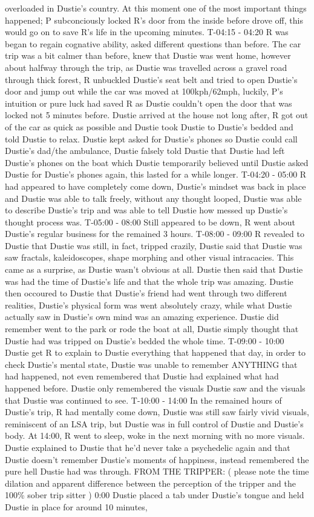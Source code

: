 \documentclass[12pt]{book}
\begin{document}
overloaded in Dustie's country. At this moment one of the most important things happened; P subconciously locked R's door from the inside before drove off, this would go on to save R's life in the upcoming minutes. T-04:15 - 04:20 R was began to regain cognative ability, asked different questions than before. The car trip was a bit calmer than before, knew that Dustie was went home, however about halfway through the trip, as Dustie was travelled across a gravel road through thick forest, R unbuckled Dustie's seat belt and tried to open Dustie's door and jump out while the car was moved at 100kph/62mph, luckily, P's intuition or pure luck had saved R as Dustie couldn't open the door that was locked not 5 minutes before. Dustie arrived at the house not long after, R got out of the car as quick as possible and Dustie took Dustie to Dustie's bedded and told Dustie to relax. Dustie kept asked for Dustie's phones so Dustie could call Dustie's dad/the ambulance, Dustie falsely told Dustie that Dustie had left Dustie's phones on the boat which Dustie temporarily believed until Dustie asked Dustie for Dustie's phones again, this lasted for a while longer. T-04:20 - 05:00 R had appeared to have completely come down, Dustie's mindset was back in place and Dustie was able to talk freely, without any thought looped, Dustie was able to describe Dustie's trip and was able to tell Dustie how messed up Dustie's thought process was. T-05:00 - 08:00 Still appeared to be down, R went about Dustie's regular business for the remained 3 hours. T-08:00 - 09:00 R revealed to Dustie that Dustie was still, in fact, tripped crazily, Dustie said that Dustie was saw fractals, kaleidoscopes, shape morphing and other visual intracacies. This came as a surprise, as Dustie wasn't obvious at all. Dustie then said that Dustie was had the time of Dustie's life and that the whole trip was amazing. Dustie then occoured to Dustie that Dustie's friend had went through two different realities, Dustie's physical form was went absolutely crazy, while what Dustie actually saw in Dustie's own mind was an amazing experience. Dustie did remember went to the park or rode the boat at all, Dustie simply thought that Dustie had was tripped on Dustie's bedded the whole time. T-09:00 - 10:00 Dustie get R to explain to Dustie everything that happened that day, in order to check Dustie's mental state, Dustie was unable to remember ANYTHING that had happened, not even remembered that Dustie had explained what had happened before. Dustie only remembered the visuals Dustie saw and the visuals that Dustie was continued to see. T-10:00 - 14:00 In the remained hours of Dustie's trip, R had mentally come down, Dustie was still saw fairly vivid visuals, reminiscent of an LSA trip, but Dustie was in full control of Dustie and Dustie's body. At 14:00, R went to sleep, woke in the next morning with no more visuals. Dustie explained to Dustie that he'd never take a psychedelic again and that Dustie doesn't remember Dustie's moments of happiness, instead remembered the pure hell Dustie had was through. FROM THE TRIPPER: ( please note the time dilation and apparent difference between the perception of the tripper and the 100\% sober trip sitter ) 0:00 Dustie placed a tab under Dustie's tongue and held Dustie in place for around 10 minutes, 
\end{document}
